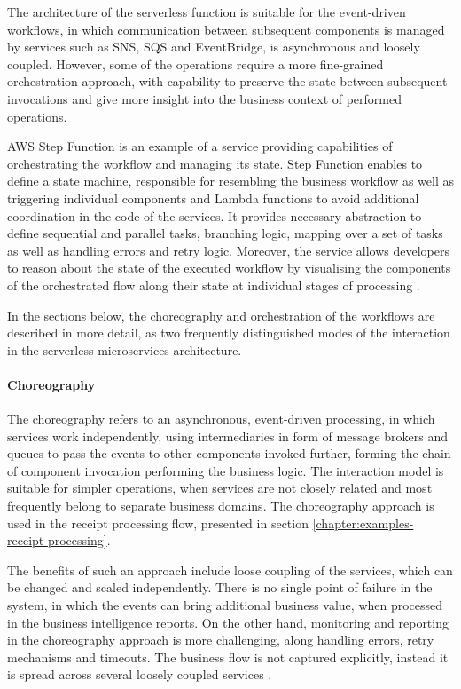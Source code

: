 The architecture of the serverless function is suitable for the event-driven workflows, in which communication between subsequent components is managed by services such as SNS, SQS and EventBridge, is asynchronous and loosely coupled.
However, some of the operations require a more fine-grained orchestration approach, with capability to preserve the state between subsequent invocations and give more insight into the business context of performed operations.

AWS Step Function is an example of a service providing capabilities of orchestrating the workflow and managing its state.
Step Function enables to define a state machine, responsible for resembling the business workflow as well as triggering individual components and Lambda functions to avoid additional coordination in the code of the services.
It provides necessary abstraction to define sequential and parallel tasks, branching logic, mapping over a set of tasks as well as handling errors and retry logic.
Moreover, the service allows developers to reason about the state of the executed workflow by visualising the components of the orchestrated flow along their state at individual stages of processing \cite{ImplementingMicroservicesOnAWS}.

In the sections below, the choreography and orchestration of the workflows are described in more detail, as two frequently distinguished modes of the interaction in the serverless microservices architecture.

\paragraph{Choreography}

The choreography refers to an asynchronous, event-driven processing, in which services work independently, using intermediaries in form of message brokers and queues to pass the events to other components invoked further, forming the chain of component invocation performing the business logic.
The interaction model is suitable for simpler operations, when services are not closely related and most frequently belong to separate business domains.
The choreography approach is used in the receipt processing flow, presented in section \ref{chapter:examples-receipt-processing}.

The benefits of such an approach include loose coupling of the services, which can be changed and scaled independently. There is no single point of failure in the system, in which the events can bring additional business value, when processed in the business intelligence reports.
On the other hand, monitoring and reporting in the choreography approach is more challenging, along handling errors, retry mechanisms and timeouts. The business flow is not captured explicitly, instead it is spread across several loosely coupled services \cite{ChoreographyVsOrchestrationInServerlessMicroservices}.

